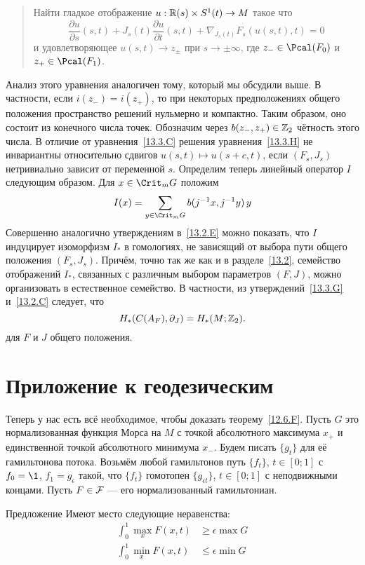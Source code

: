 \begin{quote}
  Найти гладкое отображение $u:\mathbb{R}(s)\times S^{1}(t)\to M$
  такое что 
  \begin{equation}\label{13.3.H}
    \frac{\partial u}{\partial s}(s,t)+
    J_{s}(t)\frac{\partial u}{\partial t}(s,t) +
    \nabla_{J_{s}(t)}F_{s}(u(s,t),t) = 0
  \end{equation}
  и удовлетворяющее $u(s,t)\to z_{\pm}$ при $s\to\pm\infty$, где
  $z_{-}\in\Pcal(F_{0})$ и $z_{+}\in\Pcal(F_{1})$.
\end{quote}
Анализ этого уравнения аналогичен тому, который мы обсудили выше.
В частности, если $i(z_{-})=i(z_{+})$, то при некоторых предположениях
общего положения пространство решений нульмерно и компактно. 
Таким образом, оно состоит из конечного числа точек.
Обозначим через $b(z_{-},z_{+})\in\mathbb{Z}_{2}$ чётность этого числа.
В отличие от уравнения~\ref{13.3.C} решения
уравнения~\ref{13.3.H} не инвариантны относительно сдвигов
$u(s,t)\mapsto u(s+c,t)$, если $(F_{s}, J_{s})$ нетривиально зависит
от переменной $s$.
Определим теперь линейный оператор $I$ следующим образом.
Для $x\in\Crit_{m}G$ положим
\begin{equation}
I(x) = \sum_{y\in\Crit_{m}G}b(j^{-1}x,j^{-1}y)\,y
\label{13.3.I}
\end{equation}
Совершенно аналогично утверждениям в~\ref{13.2.E} можно показать, что
$I$ индуцирует изоморфизм $I_{*}$ в гомологиях, не зависящий от выбора
пути общего положения $(F_{s}, J_{s})$. 
Причём, точно так же как и в разделе~\ref{13.2}, семейство отображений
$I_{*}$, связанных с различным выбором параметров $(F,J)$, можно
организовать в естественное семейство.
В частности, из утверждений~\ref{13.3.G} и~\ref{13.2.C} следует,
что 
\[
H_{*}(C(A_{F}),\partial_{J}) = H_{*}(M;\mathbb{Z}_{2}).
\]
для $F$ и $J$ общего положения.

\section{Приложение к геодезическим}\label{sec:13.4}

Теперь у нас есть всё необходимое, чтобы доказать теорему~\ref{12.6.F}.
Пусть $G$ это нормализованная функция Морса на $M$ с
точкой абсолютного максимума $x_{+}$ и единственной точкой абсолютного
минимума $x_{-}$. 
Будем писать $\{g_{t}\}$ для её гамильтонова потока.
Возьмём любой гамильтонов путь $\{f_{t}\}$, $t\in[0;1]$ с $f_{0}=\1$,
$f_{1}=g_{\epsilon}$ такой, что $\{f_{t}\}$ гомотопен $\{g_{\epsilon
t}\}$, $t\in[0;1]$ с неподвижными концами.
Пусть $F\in\mathcal{F}$ — его нормализованный гамильтониан.
\begin{thm}{Предложение}\label{13.4.A}
  Имеют место следующие неравенства:
  \begin{align*}
    \int_{0}^{1}\max_{x}F(x,t) &\ge \epsilon\max G\\
    \int_{0}^{1}\min_{x}F(x,t) &\le \epsilon\min G\\
  \end{align*}
\end{thm}

